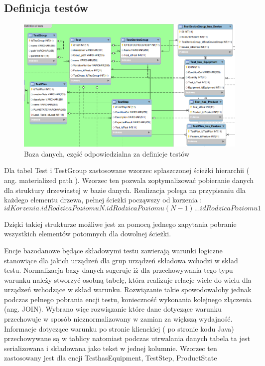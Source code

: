  

  
 \subsection{Definicja testów}   
  \begin{figure}
\centerline{\includegraphics[scale=0.5]{img/bazaDanychDefinicja.png}}
 \label{fig:bazaTesty}
      \caption{Baza danych, część odpowiedzialna za definicje testów}
\end{figure}

 Dla tabel Test i TestGroup zastosowane wzorzec spłaszczonej ścieżki hierarchii\cite{materializedPath} ( ang. materialized path ). Wzorzec ten pozwala zoptymalizować pobieranie danych dla struktury drzewiastej w bazie danych. Realizacja polega na przypisaniu dla każdego elementu drzewa, pełnej ścieżki począwszy od korzenia :
 \begin{equation}
{idKorzenia}.{idRodzicaPoziomuN}.{idRodzicaPoziomu(N-1)}...{idRodzicaPoziomu1}
\end{equation}
  
  Dzięki takiej strukturze możliwe jest za pomocą jednego zapytania pobranie wszystkich elementów potomnych dla dowolnej ścieżki.
  
  Encje bazodanowe będące składowymi testu zawierają warunki logiczne stanowiące dla jakich urządzeń dla grup urządzeń składowa wchodzi w skład testu. Normalizacja bazy danych sugeruje iż dla przechowywania tego typu warunku należy stworzyć osobną tabelę, która realizuje relacje wiele do wielu dla urządzeń wchodzące w skład warunku. Rozwiązanie takie spowodowałoby jednak podczas pełnego pobrania encji testu, konieczność wykonania kolejnego złączenia (ang. JOIN). Wybrano więc rozwiązanie które dane dotyczące warunku przechowuje w sposób nieznormalizowany w zamian za większą wydajność. Informacje dotyczące warunku po stronie klienckiej ( po stronie kodu Java) przechowywane są w tablicy natomiast podczas utrwalania danych tabela ta jest serializowana i składowana jako tekst w jednej kolumnie. Wzorzec ten zastosowany jest dla encji TesthasEquipment, TestStep, ProductState

